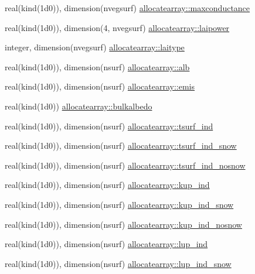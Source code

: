 \begin{DoxyCompactItemize}
\item 
real(kind(1d0)), dimension(nvegsurf) \hyperlink{namespaceallocatearray_aded55272c7c08e6a254c7a9d70546d69}{allocatearray\+::maxconductance}
\item 
real(kind(1d0)), dimension(4, nvegsurf) \hyperlink{namespaceallocatearray_a223428e8ad63f23758c195a04032b6cc}{allocatearray\+::laipower}
\item 
integer, dimension(nvegsurf) \hyperlink{namespaceallocatearray_a6f2feef0f1dc416e159eaa33bf07019e}{allocatearray\+::laitype}
\item 
real(kind(1d0)), dimension(nsurf) \hyperlink{namespaceallocatearray_ad49963261e823b38b1d9e6dad29978bd}{allocatearray\+::alb}
\item 
real(kind(1d0)), dimension(nsurf) \hyperlink{namespaceallocatearray_a5780572b4c9bdc7bbf20e4ee9d72010e}{allocatearray\+::emis}
\item 
real(kind(1d0)) \hyperlink{namespaceallocatearray_a7ded7a35772c822d536989835435a474}{allocatearray\+::bulkalbedo}
\item 
real(kind(1d0)), dimension(nsurf) \hyperlink{namespaceallocatearray_a8ff59bff050fb421cbb0626422a102c6}{allocatearray\+::tsurf\+\_\+ind}
\item 
real(kind(1d0)), dimension(nsurf) \hyperlink{namespaceallocatearray_a7594c0064ddb78e02668b1562fc0a06d}{allocatearray\+::tsurf\+\_\+ind\+\_\+snow}
\item 
real(kind(1d0)), dimension(nsurf) \hyperlink{namespaceallocatearray_a18f9679fabfeae9ce40c8f9778d6fa0f}{allocatearray\+::tsurf\+\_\+ind\+\_\+nosnow}
\item 
real(kind(1d0)), dimension(nsurf) \hyperlink{namespaceallocatearray_ad56cceda5c3f4f010df2d55ce5a8e031}{allocatearray\+::kup\+\_\+ind}
\item 
real(kind(1d0)), dimension(nsurf) \hyperlink{namespaceallocatearray_a853e1d6db3b8879d2d7657e6e2df0685}{allocatearray\+::kup\+\_\+ind\+\_\+snow}
\item 
real(kind(1d0)), dimension(nsurf) \hyperlink{namespaceallocatearray_a83fb7e3559abcc7dbd5eb41bea6b25d0}{allocatearray\+::kup\+\_\+ind\+\_\+nosnow}
\item 
real(kind(1d0)), dimension(nsurf) \hyperlink{namespaceallocatearray_abe02f0b83f99a74be1c1133b86872599}{allocatearray\+::lup\+\_\+ind}
\item 
real(kind(1d0)), dimension(nsurf) \hyperlink{namespaceallocatearray_ac854cc7121610eee303aafda55092b55}{allocatearray\+::lup\+\_\+ind\+\_\+snow}
\item 

\end{DoxyCompactItemize}
